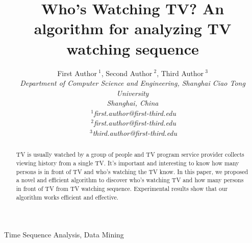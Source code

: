 \documentclass[10pt,conference,letterpaper]{IEEEtran}
\title{Who's Watching TV? An algorithm for analyzing TV watching sequence}
\author{%
{First Author{\small $~^{1}$}, Second Author{\small $~^{2}$}, Third Author{\small $~^{3}$} }%
\vspace{1.6mm}\\
\fontsize{10}{10}\selectfont\itshape
Department of Computer Science and Engineering, Shanghai Ciao Tong University\\
Shanghai, China\\
\fontsize{9}{9}\selectfont\ttfamily\upshape
$~^{1}$first.author@first-third.edu\\
$~^{2}$first.author@first-third.edu\\
$~^{3}$third.author@first-third.edu%
}
\begin{document}
\maketitle
%
\begin{abstract} 
TV is usually watched by a group of people and TV program service provider collects viewing history
from a single TV. It's important and interesting to know how many persons is in front of TV and
who's watching the TV know. In this paper, we proposed a novel and efficient algorithm to
discover who's watching TV and how many persons in front of TV from TV watching sequence.
Experimental results show that our algorithm works efficient and effective.
\end{abstract}

\begin{keywords}
Time Sequence Analysis, Data Mining
\end{keywords}
%









\balance

\end{document}
